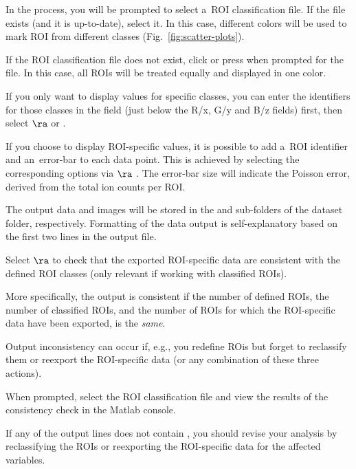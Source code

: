 \bul In the process, you will be prompted to select a~ROI classification file. If the file exists (and it is up-to-date), select it. In this case, different colors will be used to mark ROI from different classes (Fig.~\ref{fig:scatter-plots}). 

\bul If the ROI classification file does not exist, click  or press  when prompted for the file. In this case, all ROIs will be treated equally and displayed in one color.

\bul If you only want to display values for specific classes, you can enter the identifiers for those classes in the  field (just below the R/x, G/y and B/z fields) first, then select  $\ra$  or .

\bul If you choose to display ROI-specific values, it is possible to add a~ROI identifier and an~error-bar to each data point. This is achieved by selecting the corresponding options via  $\ra$ . The error-bar size will indicate the Poisson error, derived from the total ion counts per ROI.

\bul The output data and images will be stored in the  and  sub-folders of the dataset folder, respectively. Formatting of the data output is self-explanatory based on the first two lines in the output file.

\s Select  $\ra$  to check that the exported ROI-specific data are consistent with the defined ROI  classes (only relevant if working with classified ROIs). 

\bul More specifically, the output is consistent if the number of defined ROIs, the number of classified ROIs, and the number of ROIs for which the ROI-specific data have been exported, is the \emph{same}.

\bul Output inconsistency can occur if, e.g., you redefine ROis but forget to reclassify them or reexport the ROI-specific data (or any combination of these three actions).

\bul When prompted, select the ROI classification file and view the results of the consistency check in the Matlab console. 

\bul If any of the output lines does not contain , you should revise your analysis by reclassifying the ROIs or reexporting the ROI-specific data for the affected variables.


